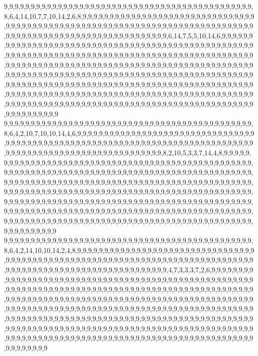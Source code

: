 9,9,9,9,9,9,9,9,9,9,9,9,9,9,9,9,9,9,9,9,9,9,9,9,9,9,9,9,9,9,9,9,9,9,9,9,9,9,9,9,9,9,9,9,9,9,8,6,4,14,10,7,7,10,14,2,6,8,9,9,9,9,9,9,9,9,9,9,9,9,9,9,9,9,9,9,9,9,9,9,9,9,9,9,9,9,9,9,9,9,9,9,9,9,9,9,9,9,9,9,9,9,9,9,9,9,9,9,9,9,9,9,9,9,9,9,9,9,9,9,9,9,9,9,9,9,9,9,9,9,9,9,9,9,9,9,9,9,9,9,9,9,9,9,9,9,9,9,9,9,9,9,9,9,9,9,9,9,9,9,9,9,9,9,9,9,6,14,7,5,5,10,14,6,9,9,9,9,9,9,9,9,9,9,9,9,9,9,9,9,9,9,9,9,9,9,9,9,9,9,9,9,9,9,9,9,9,9,9,9,9,9,9,9,9,9,9,9,9,9,9,9,9,9,9,9,9,9,9,9,9,9,9,9,9,9,9,9,9,9,9,9,9,9,9,9,9,9,9,9,9,9,9,9,9,9,9,9,9,9,9,9,9,9,9,9,9,9,9,9,9,9,9,9,9,9,9,9,9,9,9,9,9,9,9,9,9,9,9,9,9,9,9,9,9,9,9,9,9,9,9,9,9,9,9,9,9,9,9,9,9,9,9,9,9,9,9,9,9,9,9,9,9,9,9,9,9,9,9,9,9,9,9,9,9,9,9,9,9,9,9,9,9,9,9,9,9,9,9,9,9,9,9,9,9,9,9,9,9,9,9,9,9,9,9,9,9,9,9,9,9,9,9,9,9,9,9,9,9,9,9,9,9,9,9,9,9,9,9,9,9,9,9,9,9,9,9,9,9,9,9,9,9,9,9,9,9,9,9,9,9,9,9,9,9,9,9,9,9,9,9,9,9,9,9,9,9,9,9,9,9,9,9,9,9,9,9,9,9,9,9,9,9,9,9,9,9,9,9,9,9,9,9,9,9,9,9,9,9,9,9,9,9,9,9,9,9,9,9,9,9,9,9,9,9,9,9,9,9,9,9,9,9,9,9,9,9,9,9,9,9,9,9,9,9,9,9,9,9,9,9,9,9,9,9,9,9,9,9,9,9,9
9,9,9,9,9,9,9,9,9,9,9,9,9,9,9,9,9,9,9,9,9,9,9,9,9,9,9,9,9,9,9,9,9,9,9,9,9,9,9,9,9,9,9,9,9,9,8,6,4,2,10,7,10,10,14,4,6,9,9,9,9,9,9,9,9,9,9,9,9,9,9,9,9,9,9,9,9,9,9,9,9,9,9,9,9,9,9,9,9,9,9,9,9,9,9,9,9,9,9,9,9,9,9,9,9,9,9,9,9,9,9,9,9,9,9,9,9,9,9,9,9,9,9,9,9,9,9,9,9,9,9,9,9,9,9,9,9,9,9,9,9,9,9,9,9,9,9,9,9,9,9,9,9,9,9,9,9,9,9,9,9,9,9,9,9,8,2,10,5,3,3,7,14,4,8,9,9,9,9,9,9,9,9,9,9,9,9,9,9,9,9,9,9,9,9,9,9,9,9,9,9,9,9,9,9,9,9,9,9,9,9,9,9,9,9,9,9,9,9,9,9,9,9,9,9,9,9,9,9,9,9,9,9,9,9,9,9,9,9,9,9,9,9,9,9,9,9,9,9,9,9,9,9,9,9,9,9,9,9,9,9,9,9,9,9,9,9,9,9,9,9,9,9,9,9,9,9,9,9,9,9,9,9,9,9,9,9,9,9,9,9,9,9,9,9,9,9,9,9,9,9,9,9,9,9,9,9,9,9,9,9,9,9,9,9,9,9,9,9,9,9,9,9,9,9,9,9,9,9,9,9,9,9,9,9,9,9,9,9,9,9,9,9,9,9,9,9,9,9,9,9,9,9,9,9,9,9,9,9,9,9,9,9,9,9,9,9,9,9,9,9,9,9,9,9,9,9,9,9,9,9,9,9,9,9,9,9,9,9,9,9,9,9,9,9,9,9,9,9,9,9,9,9,9,9,9,9,9,9,9,9,9,9,9,9,9,9,9,9,9,9,9,9,9,9,9,9,9,9,9,9,9,9,9,9,9,9,9,9,9,9,9,9,9,9,9,9,9,9,9,9,9,9,9,9,9,9,9,9,9,9,9,9,9,9,9,9,9,9,9,9,9,9,9,9,9,9,9,9,9,9,9,9,9,9,9,9,9,9,9,9,9,9,9,9,9,9,9,9,9,9,9,9,9,9,9,9,9,9,9,9,9
9,9,9,9,9,9,9,9,9,9,9,9,9,9,9,9,9,9,9,9,9,9,9,9,9,9,9,9,9,9,9,9,9,9,9,9,9,9,9,9,9,9,9,9,9,9,8,6,4,2,14,10,10,14,2,4,8,9,9,9,9,9,9,9,9,9,9,9,9,9,9,9,9,9,9,9,9,9,9,9,9,9,9,9,9,9,9,9,9,9,9,9,9,9,9,9,9,9,9,9,9,9,9,9,9,9,9,9,9,9,9,9,9,9,9,9,9,9,9,9,9,9,9,9,9,9,9,9,9,9,9,9,9,9,9,9,9,9,9,9,9,9,9,9,9,9,9,9,9,9,9,9,9,9,9,9,9,9,9,9,9,9,9,9,9,9,4,7,3,3,3,7,2,6,9,9,9,9,9,9,9,9,9,9,9,9,9,9,9,9,9,9,9,9,9,9,9,9,9,9,9,9,9,9,9,9,9,9,9,9,9,9,9,9,9,9,9,9,9,9,9,9,9,9,9,9,9,9,9,9,9,9,9,9,9,9,9,9,9,9,9,9,9,9,9,9,9,9,9,9,9,9,9,9,9,9,9,9,9,9,9,9,9,9,9,9,9,9,9,9,9,9,9,9,9,9,9,9,9,9,9,9,9,9,9,9,9,9,9,9,9,9,9,9,9,9,9,9,9,9,9,9,9,9,9,9,9,9,9,9,9,9,9,9,9,9,9,9,9,9,9,9,9,9,9,9,9,9,9,9,9,9,9,9,9,9,9,9,9,9,9,9,9,9,9,9,9,9,9,9,9,9,9,9,9,9,9,9,9,9,9,9,9,9,9,9,9,9,9,9,9,9,9,9,9,9,9,9,9,9,9,9,9,9,9,9,9,9,9,9,9,9,9,9,9,9,9,9,9,9,9,9,9,9,9,9,9,9,9,9,9,9,9,9,9,9,9,9,9,9,9,9,9,9,9,9,9,9,9,9,9,9,9,9,9,9,9,9,9,9,9,9,9,9,9,9,9,9,9,9,9,9,9,9,9,9,9,9,9,9,9,9,9,9,9,9,9,9,9,9,9,9,9,9,9,9,9,9,9,9,9,9,9,9,9,9,9,9,9,9,9,9,9,9,9,9,9,9,9,9,9,9,9,9,9,9,9,9,9,9,9,9
